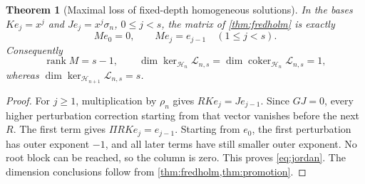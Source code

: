 \documentclass[11pt,a4paper]{article}
\numberwithin{equation}{section}
\newtheorem{theorem}{Theorem}[section]
\theoremstyle{definition}
\theoremstyle{remark}
\newcommand{\HH}{\mathcal H}
\newcommand{\cL}{\mathcal L}
\newcommand{\coker}{\operatorname{coker}}
\newcommand{\rank}{\operatorname{rank}}
\begin{document}
\begin{theorem}[Maximal loss of fixed-depth homogeneous solutions]
\label{thm:sharp-matrix}
In the bases $K e_j=x^j$ and $J e_j=x^j\sigma_n$, $0\le j<s$, the matrix of \cref{thm:fredholm} is exactly
\begin{equation}
 Me_0=0,\qquad Me_j=e_{j-1}\quad(1\le j<s).
 \label{eq:jordan}
\end{equation}
Consequently
\[
 \rank M=s-1,\qquad
 \dim\ker_{\HH_n}\cL_{n,s}
 =\dim\coker_{\HH_n}\cL_{n,s}=1,
\]
whereas $\dim\ker_{\HH_{n+1}}\cL_{n,s}=s$.
\end{theorem}
\begin{proof}
For $j\ge1$, multiplication by $\rho_n$ gives $RK e_j=J e_{j-1}$. Since $GJ=0$, every higher perturbation correction starting from that vector vanishes before the next $R$. The first term gives $\Pi RK e_j=e_{j-1}$. Starting from $e_0$, the first perturbation has outer exponent $-1$, and all later terms have still smaller outer exponent. No root block can be reached, so the column is zero. This proves \eqref{eq:jordan}. The dimension conclusions follow from \cref{thm:fredholm,thm:promotion}.
\end{proof}
\end{document}
